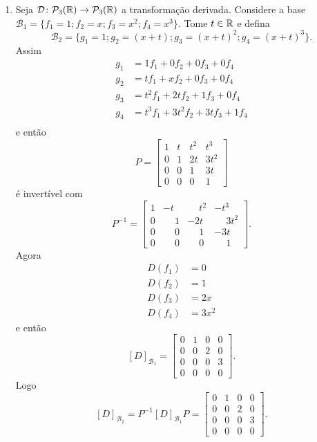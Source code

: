 \begin{exemplos}
\begin{enumerate}[label={\arabic*})]
    \item Seja $\mathcal{D} \colon \mathcal{P}_3(\mathbb{R}) \to \mathcal{P}_3(\mathbb{R})$ a transformação derivada. Considere a base $\mathcal{B}_1 = \{f_1 = 1; f_2 = x; f_3 = x^2; f_4 = x^3\}$. Tome $t \in \mathbb{R}$ e defina
    \[
      \mathcal{B}_2 = \{g_1 = 1; g_2 = (x + t); g_3 = (x + t)^2; g_4 = (x + t)^3\}.
    \]
    Assim
    \begin{align*}
      g_1 &= 1f_1 + 0f_2 + 0f_3 + 0f_4\\
      g_2 &= tf_1 + xf_2 + 0f_3 + 0f_4\\
      g_3 &= t^2f_1 + 2tf_2 + 1f_3 + 0f_4\\
      g_4 &= t^3f_1 + 3t^2f_2 + 3tf_3 + 1f_4\\
    \end{align*}
    e então
    \[
      P = \begin{bmatrix}
        1 & t & t^2 & t^3\\
        0 & 1 & 2t & 3t^2\\
        0 & 0 & 1 & 3t\\
        0 & 0 & 0 & 1
      \end{bmatrix}
    \]
    é invertível com
    \[
      P^{-1} = \begin{bmatrix}
        1 & -t & \phantom{-}t^2 & -t^3\\
        0 & \phantom{-}1 & -2t & \phantom{-}3t^2\\
        0 & \phantom{-}0 & \phantom{-}1 & -3t\\
        0 & \phantom{-}0 & \phantom{-}0 & \phantom{-}1
      \end{bmatrix}.
    \]
    Agora
    \begin{align*}
      D(f_1) &= 0\\
      D(f_2) &= 1\\
      D(f_3) &= 2x\\
      D(f_4) &= 3x^2
    \end{align*}
    e então
    \[
      [D]_{\mathcal{B}_1} = \begin{bmatrix}
        0 & 1 & 0 & 0\\
        0 & 0 & 2 & 0\\
        0 & 0 & 0 & 3\\
        0 & 0 & 0 & 0
      \end{bmatrix}.
    \]
    Logo
    \[
      [D]_{\mathcal{B}_2} = P^{-1}[D]_{\mathcal{B}_1}P = \begin{bmatrix}
        0 & 1 & 0 & 0\\
        0 & 0 & 2 & 0\\
        0 & 0 & 0 & 3\\
        0 & 0 & 0 & 0
      \end{bmatrix}.
    \]
  \end{enumerate}
\end{exemplos}
